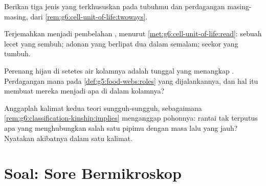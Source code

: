 \begin{exercise}[$\star\star$]\label{exo:g6:cell-unit-of-life:9}
Berikan tiga jenis  yang terkhususkan pada tubuhmu dan perdagangan
masing-masing, dari \cref{rem:g6:cell-unit-of-life:twoways}.
\end{exercise}

\begin{exercise}[$\star\star$]\label{exo:g6:cell-unit-of-life:10}
Terjemahkan menjadi pembelahan , menurut
\cref{met:g6:cell-unit-of-life:read}: sebuah lecet yang sembuh;
adonan yang berlipat dua dalam semalam; seekor  yang tumbuh.
\end{exercise}

\begin{exercise}[$\star\star$]\label{exo:g6:cell-unit-of-life:11}
Perenang hijau di setetes air kolamnya adalah  tunggal yang
menangkap . Perdagangan mana pada
\cref{def:g5:food-webs:roles} yang dijalankannya, dan hal itu membuat
mereka menjadi apa di dalam  kolamnya?
\end{exercise}

\begin{exercise}[$\star\star\star$]\label{exo:g6:cell-unit-of-life:12}
Anggaplah kalimat kedua teori  sungguh-sungguh, sebagaimana
\cref{rem:g6:classification-kinship:implies} menganggap pohonnya:
rantai tak terputus apa yang menghubungkan salah satu  pipimu
dengan masa lalu yang jauh? Nyatakan akibatnya dalam satu kalimat.
\end{exercise}

\section{Soal: Sore Bermikroskop}


